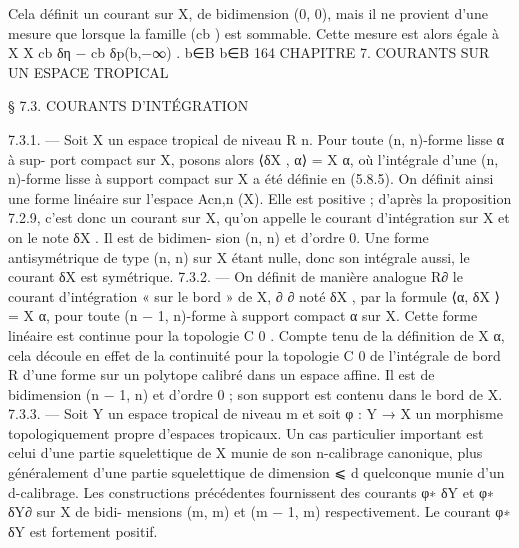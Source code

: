 \documentclass[
  10pt,
]{article}
\newenvironment{Shaded}{}{}
\newcommand{\NormalTok}[1]{#1}
\begin{document}
\begin{Shaded}
\begin{Highlighting}[]
\NormalTok{Cela définit un courant sur X, de bidimension (0, 0), mais il ne provient d’une mesure}
\NormalTok{que lorsque la famille (cb ) est sommable. Cette mesure est alors égale à}
\NormalTok{                                   X         X}
\NormalTok{                                     cb δη −   cb δp(b,−∞) .}
\NormalTok{                                  b∈B         b∈B}
\NormalTok{164                  CHAPITRE 7. COURANTS SUR UN ESPACE TROPICAL}

\NormalTok{                      § 7.3. COURANTS D’INTÉGRATION}

\NormalTok{7.3.1. — Soit X un espace tropical de niveau    R n. Pour toute (n, n){-}forme lisse α à sup{-}}
\NormalTok{port compact sur X, posons alors ⟨δX , α⟩ = X α, où l’intégrale d’une (n, n){-}forme lisse}
\NormalTok{à support compact sur X a été définie en (5.8.5). On définit ainsi une forme linéaire sur}
\NormalTok{l’espace Acn,n (X). Elle est positive ; d’après la proposition 7.2.9, c’est donc un courant}
\NormalTok{sur X, qu’on appelle le courant d’intégration sur X et on le note δX . Il est de bidimen{-}}
\NormalTok{sion (n, n) et d’ordre 0. Une forme antisymétrique de type (n, n) sur X étant nulle, donc}
\NormalTok{son intégrale aussi, le courant δX est symétrique.}
\NormalTok{7.3.2. — On définit de manière analogue}
\NormalTok{                                   R∂       le courant d’intégration « sur le bord » de X,}
\NormalTok{      ∂                       ∂}
\NormalTok{noté δX , par la formule ⟨α, δX ⟩ = X α, pour toute (n − 1, n){-}forme à support compact α}
\NormalTok{sur X.}
\NormalTok{  Cette   forme linéaire est continue pour la topologie C 0 . Compte tenu de la définition}
\NormalTok{de X α, cela découle en effet de la continuité pour la topologie C 0 de l’intégrale de bord}
\NormalTok{   R}
\NormalTok{d’une forme sur un polytope calibré dans un espace affine.}
\NormalTok{  Il est de bidimension (n − 1, n) et d’ordre 0 ; son support est contenu dans le bord}
\NormalTok{de X.}
\NormalTok{7.3.3. — Soit Y un espace tropical de niveau m et soit φ : Y → X un morphisme}
\NormalTok{topologiquement propre d’espaces tropicaux. Un cas particulier important est celui d’une}
\NormalTok{partie squelettique de X munie de son n{-}calibrage canonique, plus généralement d’une}
\NormalTok{partie squelettique de dimension ⩽ d quelconque munie d’un d{-}calibrage.}
\NormalTok{  Les constructions précédentes fournissent des courants φ∗ δY et φ∗ δY∂ sur X de bidi{-}}
\NormalTok{mensions (m, m) et (m − 1, m) respectivement.}
\NormalTok{  Le courant φ∗ δY est fortement positif.}

\end{Highlighting}
\end{Shaded}
\end{document}
